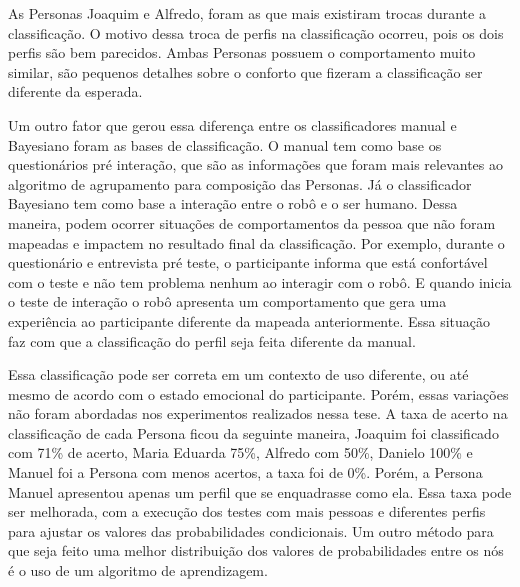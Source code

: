 As Personas Joaquim e Alfredo, foram as que mais existiram trocas durante a classificação. O motivo dessa troca de perfis na classificação ocorreu, pois os dois perfis são bem parecidos. Ambas Personas possuem o comportamento muito similar, são pequenos detalhes sobre o conforto que fizeram a classificação ser diferente da esperada.

Um outro fator que gerou essa diferença entre os classificadores manual e Bayesiano foram as bases de classificação. O manual tem como base os questionários pré interação, que são as informações que foram mais relevantes ao algoritmo de agrupamento para composição das Personas. Já o classificador Bayesiano tem como base a interação entre o robô e o ser humano. Dessa maneira, podem ocorrer situações de comportamentos da pessoa que não foram mapeadas e impactem no resultado final da classificação. Por exemplo, durante o questionário e entrevista pré teste, o participante informa que está confortável com o teste e não tem problema nenhum ao interagir com o robô. E quando inicia o teste de interação o robô apresenta um comportamento que gera uma experiência ao participante diferente da mapeada anteriormente. Essa situação faz com que a classificação do perfil seja feita diferente da manual.

Essa classificação pode ser correta em um contexto de uso diferente, ou até mesmo de acordo com o estado emocional do participante. Porém, essas variações não foram abordadas nos experimentos realizados nessa tese. A taxa de acerto na classificação de cada Persona ficou da seguinte maneira, Joaquim foi classificado com 71\% de acerto, Maria Eduarda 75\%, Alfredo com 50\%, Danielo 100\% e Manuel foi a Persona com menos acertos, a taxa foi de 0\%. Porém, a Persona Manuel apresentou apenas um perfil que se enquadrasse como ela. Essa taxa pode ser melhorada, com a execução dos testes com mais pessoas e diferentes perfis para ajustar os valores das probabilidades condicionais. Um outro método para que seja feito uma melhor distribuição dos valores de probabilidades entre os nós é o uso de um algoritmo de aprendizagem.

